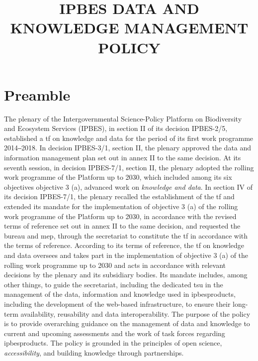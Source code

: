 \documentclass{article}
\title{IPBES DATA AND KNOWLEDGE MANAGEMENT POLICY}
\begin{document}
\maketitle


% 


\tableofcontents

\newpage





\section{Preamble}

The \gls{plenary} of the Intergovernmental Science-Policy Platform on Biodiversity and Ecosystem Services (IPBES), in section II of its decision IPBES-2/5, established a \gls{tf} on knowledge and data for the period of its first work programme 2014‒2018. In decision IPBES-3/1, section II, the \gls{plenary} approved the data and information management plan set out in annex II to the same decision. At its seventh session, in decision IPBES-7/1, section II, the \gls{plenary} adopted the rolling work programme of the Platform up to 2030, which included among its six objectives objective 3 (a), advanced work on \textit{knowledge and data}. In section IV of its decision IPBES-7/1, the \gls{plenary} recalled the establishment of the \gls{tf} and extended its mandate for the implementation of objective 3 (a) of the rolling work programme of the Platform up to 2030, in accordance with the revised terms of reference set out in annex II to the same decision, and requested the \gls{bureau} and \gls{mep}, through the \gls{secretariat} to constitute the \gls{tf} in accordance with the terms of reference. According to its terms of reference, the \gls{tf} on knowledge and data oversees and takes part in the implementation of objective 3 (a) of the rolling work programme up to 2030 and acts in accordance with relevant decisions by the \gls{plenary} and its subsidiary bodies. Its mandate includes, among other things, to guide the \gls{secretariat}, including the dedicated \gls{tsu} in the management of the \gls{data}, information and knowledge used in \glspl{ipbesproduct}, including the development of the web-based infrastructure, to ensure their long-term availability, reusability and data interoperability. The purpose of the policy is to provide overarching guidance on the management of data and knowledge to current and upcoming assessments and the work of task forces regarding \glspl{ipbesproduct}. The policy is grounded in the principles of open science, \textit{accessibility}, and building knowledge through partnerships.
\end{document}
